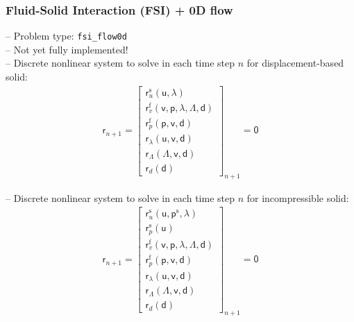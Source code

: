 \documentclass[a4paper,12pt]{report}
\newcommand{\bs}[1]{\boldsymbol{#1}}
\newcommand{\ROP}{\bs{\mathsf{r}}}
\newcommand{\LM}{\bs{\mathsf{\lambda}}}
\newcommand{\LMZ}{\bs{\mathsf{\Lambda}}}
\begin{document}
\subsubsection{Fluid-Solid Interaction (FSI) + 0D flow}\label{subsubsec:fsi_flow0d}

-- Problem type: \verb"fsi_flow0d"\\

-- Not yet fully implemented!\\

-- Discrete nonlinear system to solve in each time step $n$ for displacement-based solid:
\begin{align}
\ROP_{n+1} = \begin{bmatrix} \ROP_{u}^{\mathrm{s}}(\bs{\mathsf{u}},\LM) \\ \ROP_{v}^{\mathrm{f}}(\bs{\mathsf{v}},\bs{\mathsf{p}},\LM,\LMZ,\bs{\mathsf{d}}) \\ \ROP_{p}^{\mathrm{f}}(\bs{\mathsf{p}},\bs{\mathsf{v}},\bs{\mathsf{d}}) \\ \ROP_{\mathit{\lambda}}(\bs{\mathsf{u}},\bs{\mathsf{v}},\bs{\mathsf{d}}) \\ \ROP_{\mathit{\Lambda}}(\LMZ,\bs{\mathsf{v}},\bs{\mathsf{d}}) \\ \ROP_{d}(\bs{\mathsf{d}}) \end{bmatrix}_{n+1} = \bs{\mathsf{0}}\label{eq:nonlin_sys_fsi_0d}
\end{align}

-- Discrete nonlinear system to solve in each time step $n$ for incompressible solid:
\begin{align}
\ROP_{n+1} = \begin{bmatrix} \ROP_{u}^{\mathrm{s}}(\bs{\mathsf{u}},\bs{\mathsf{p}}^{\mathrm{s}},\LM) \\ \ROP_{p}^{\mathrm{s}}(\bs{\mathsf{u}}) \\ \ROP_{v}^{\mathrm{f}}(\bs{\mathsf{v}},\bs{\mathsf{p}},\LM,\LMZ,\bs{\mathsf{d}}) \\ \ROP_{p}^{\mathrm{f}}(\bs{\mathsf{p}},\bs{\mathsf{v}},\bs{\mathsf{d}}) \\ \ROP_{\mathit{\lambda}}(\bs{\mathsf{u}},\bs{\mathsf{v}},\bs{\mathsf{d}}) \\ \ROP_{\mathit{\Lambda}}(\LMZ,\bs{\mathsf{v}},\bs{\mathsf{d}}) \\ \ROP_{d}(\bs{\mathsf{d}}) \end{bmatrix}_{n+1} = \bs{\mathsf{0}}\label{eq:nonlin_sys_fsi_0d_inc}
\end{align}
\end{document}
